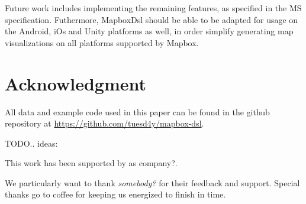 \documentclass[conference]{IEEEtran}
\begin{document}
Future work includes implementing the remaining features, as specified in the MS specification. Futhermore, MapboxDsl should be able to be adapted for usage on the Android, iOs and Unity platforms as well, in order simplify generating map visualizations on all platforms supported by Mapbox.


\section*{Acknowledgment}

All data and example code used in this paper can be found in the github repository at  \href{https://github.com/tuesd4y/mapbox-dsl}{https://github.com/tuesd4y/mapbox-dsl}.

TODO.. ideas: 

This work has been supported by as company?.

We particularly want to thank \textit{somebody?} for their feedback and support. Special thanks go to coffee for keeping us energized to finish in time.

\end{document}
